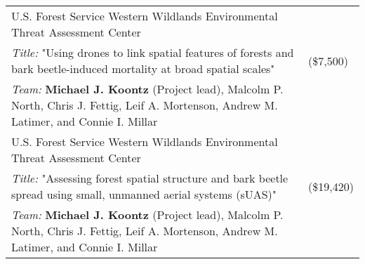 \begin{longtable}{@{}>{\raggedright}p{5.25in} @{} >{\raggedleft}X@{}}
U.S. Forest Service Western Wildlands Environmental Threat Assessment Center & 2018 \tabularnewline
\addtolength{\leftskip}{5ex}\emph{Title:} "Using drones to link spatial features of forests and bark beetle-induced mortality at broad spatial scales" & (\$7,500) \tabularnewline
\addtolength{\leftskip}{5ex}\emph{Team:} \textbf{Michael J. Koontz} (Project lead), Malcolm P. North, Chris J. Fettig, Leif A. Mortenson, Andrew M. Latimer, and Connie I. Millar & \tabularnewline

U.S. Forest Service Western Wildlands Environmental Threat Assessment Center & 2017 \tabularnewline
\addtolength{\leftskip}{5ex}\emph{Title:} "Assessing forest spatial structure and bark beetle spread using small, unmanned aerial systems (sUAS)" & (\$19,420) \tabularnewline
\addtolength{\leftskip}{5ex}\emph{Team:} \textbf{Michael J. Koontz} (Project lead), Malcolm P. North, Chris J. Fettig, Leif A. Mortenson, Andrew M. Latimer, and Connie I. Millar & \tabularnewline

\end{longtable}
